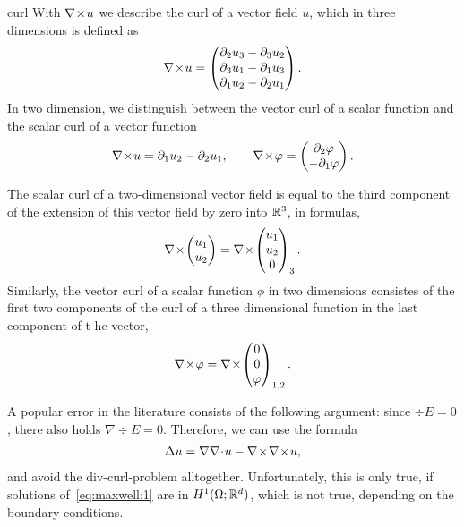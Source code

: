 \begin{Notation}{curl}
  With $\nabla\!\times\! u$ we describe the curl of a vector field $u$, which in
  three dimensions is defined as
  \begin{gather}
    \label{eq:maxwell:2}
    \nabla\!\times\! u =
    \begin{pmatrix}
      \partial_2u_3-\partial_3u_2\\\partial_3u_1-\partial_1u_3\\\partial_1u_2-\partial_2u_1
    \end{pmatrix}.
  \end{gather}
  In two dimension, we distinguish between the vector curl of a scalar
  function and the scalar curl of a vector function
  \begin{gather}
    \nabla\!\times\! u = \partial_1u_2-\partial_2u_1,
    \qquad
    \nabla\!\times\! \varphi =
    \begin{pmatrix}
      \partial_2 \varphi \\ -\partial_1\varphi
    \end{pmatrix}.
  \end{gather}
\end{Notation}

\begin{remark}
  The scalar curl of a two-dimensional vector field is equal to the
  third component of the extension of this vector field by zero into
  $\mathbb R^3$, in formulas,
  \begin{gather*}
    \nabla\!\times\!
    \begin{pmatrix}
      u_1\\u_2
    \end{pmatrix}
    =
    \nabla\!\times\!
    \begin{pmatrix}
      u_1\\u_2\\0
    \end{pmatrix}_3.
  \end{gather*}
  Similarly, the vector curl of a scalar function $\phi$ in two dimensions
  consistes of the first two components of the curl of a three
  dimensional function in the last component of t he vector,
  \begin{gather*}
    \nabla\!\times\! \varphi = \nabla\!\times\!
    \begin{pmatrix}
      0\\0\\\varphi
    \end{pmatrix}_{1,2}.
  \end{gather*}
\end{remark}
\begin{remark}
  A popular error in the literature consists of the following
  argument: since $\div E = 0$, there also holds $\nabla \div E =
  0$. Therefore, we can use the formula
  \begin{gather*}
    \Delta u = \nabla\nabla\!\cdot\! u - \nabla\!\times\!\nabla\!\times\! u,
  \end{gather*}
  and avoid the div-curl-problem alltogether. Unfortunately, this is
  only true, if solutions of~\eqref{eq:maxwell:1} are in
  $H^1(\Omega;\mathbb R^d)$, which is not true, depending on the boundary
  conditions.
\end{remark}

